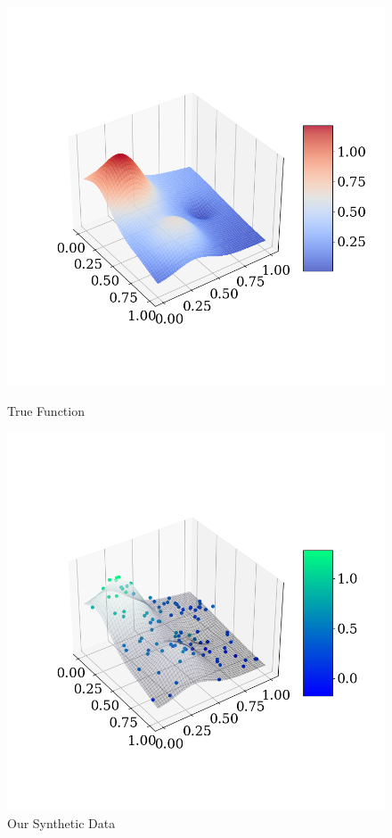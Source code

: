 \documentclass[twoside,11pt]{report}
\begin{document}
\begin{figure}[!h]
\begin{minipage}[!t]{.48\linewidth}
    \begin{center}
        \includegraphics[width=1.1\textwidth]{../runsAndAdditions/trueFunction.png}
        \caption{True Function}\label{fig:truefunction}
\end{center}
\end{minipage}
\hspace{2mm}
\begin{minipage}[!t]{.48\linewidth}
    \begin{center}
        \includegraphics[width=1.1\textwidth]{../runsAndAdditions/synthDataSide.png}
        \caption{Our Synthetic Data}\label{fig:synthdataside}
    \end{center}
\end{minipage}
\end{figure}
\end{document}
